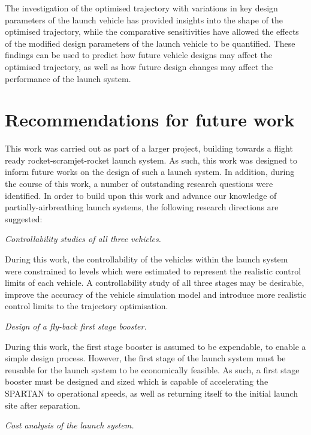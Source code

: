 The investigation of the optimised trajectory with variations in key design parameters of the launch vehicle has provided insights into the shape of the optimised trajectory, while the comparative sensitivities have allowed the effects of the modified design parameters of the launch vehicle to be quantified. These findings can be used to predict how future vehicle designs may affect the optimised trajectory, as well as how future design changes may affect the performance of the launch system. 

  \chapter{Recommendations for future work}
 This work was carried out as part of a larger project, building towards a flight ready rocket-scramjet-rocket launch system. As such, this work was designed to inform future works on the design of such a launch system. 
 In addition, during the course of this work, a number of outstanding research questions were identified.
 In order to build upon this work and advance our knowledge of partially-airbreathing launch systems, the following research directions are suggested:

\vspace{10pt}
\textit{Controllability studies of all three vehicles.}

 \noindent
During this work, the controllability of the vehicles within the launch system were constrained to levels which were estimated to represent the realistic control limits of each vehicle. 
A controllability study of all three stages may be desirable, improve the accuracy of the vehicle simulation model and introduce more realistic control limits to the trajectory optimisation. 

\vspace{10pt}
 \textit{Design of a fly-back first stage booster.}
 
 \noindent
 During this work, the first stage booster is assumed to be expendable, to enable a simple design process. However, the first stage of the launch system must be reusable for the launch system to be economically feasible. As such, a first stage booster must be designed and sized which is capable of accelerating the SPARTAN to operational speeds, as well as returning itself to the initial launch site after separation. 

\vspace{10pt}
 \textit{Cost analysis of the launch system.}

